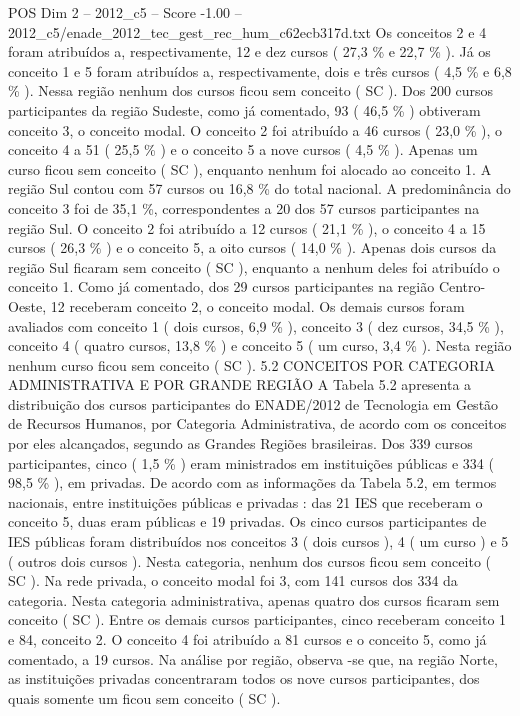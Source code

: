 \begin{textsample}{POS Dim 2 – 2012\_c5 – Score -1.00 – 2012\_c5/enade\_2012\_tec\_gest\_rec\_hum\_c62ecb317d.txt}
Os conceitos 2 e 4 foram atribuídos a, respectivamente, 12 e dez cursos ( 27,3 \% e 22,7 \% ).
Já os conceito 1 e 5 foram atribuídos a, respectivamente, dois e três cursos ( 4,5 \% e 6,8 \% ).
Nessa região nenhum dos cursos ficou sem conceito ( SC ).
Dos 200 cursos participantes da região Sudeste, como já comentado, 93 ( 46,5 \% ) obtiveram conceito 3, o conceito modal.
O conceito 2 foi atribuído a 46 cursos ( 23,0 \% ), o conceito 4 a 51 ( 25,5 \% ) e o conceito 5 a nove cursos ( 4,5 \% ).
Apenas um curso ficou sem conceito ( SC ), enquanto nenhum foi alocado ao conceito 1.
A região Sul contou com 57 cursos ou 16,8 \% do total nacional.
A predominância do conceito 3 foi de 35,1 \%, correspondentes a 20 dos 57 cursos participantes na região Sul.
O conceito 2 foi atribuído a 12 cursos ( 21,1 \% ), o conceito 4 a 15 cursos ( 26,3 \% ) e o conceito 5, a oito cursos ( 14,0 \% ).
Apenas dois cursos da região Sul ficaram sem conceito ( SC ), enquanto a nenhum deles foi atribuído o conceito 1.
Como já comentado, dos 29 cursos participantes na região Centro-Oeste, 12 receberam conceito 2, o conceito modal.
Os demais cursos foram avaliados com conceito 1 ( dois cursos, 6,9 \% ), conceito 3 ( dez cursos, 34,5 \% ), conceito 4 ( quatro cursos, 13,8 \% ) e conceito 5 ( um curso, 3,4 \% ).
Nesta região nenhum curso ficou sem conceito ( SC ). 5.2 CONCEITOS POR CATEGORIA ADMINISTRATIVA E POR GRANDE REGIÃO A Tabela 5.2 apresenta a distribuição dos cursos participantes do ENADE/2012 de Tecnologia em Gestão de Recursos Humanos, por Categoria Administrativa, de acordo com os conceitos por eles alcançados, segundo as Grandes Regiões brasileiras.
Dos 339 cursos participantes, cinco ( 1,5 \% ) eram ministrados em instituições públicas e 334 ( 98,5 \% ), em privadas.
De acordo com as informações da Tabela 5.2, em termos nacionais, entre instituições públicas e privadas : das 21 IES que receberam o conceito 5, duas eram públicas e 19 privadas.
Os cinco cursos participantes de IES públicas foram distribuídos nos conceitos 3 ( dois cursos ), 4 ( um curso ) e 5 ( outros dois cursos ).
Nesta categoria, nenhum dos cursos ficou sem conceito ( SC ).
Na rede privada, o conceito modal foi 3, com 141 cursos dos 334 da categoria.
Nesta categoria administrativa, apenas quatro dos cursos ficaram sem conceito ( SC ).
Entre os demais cursos participantes, cinco receberam conceito 1 e 84, conceito 2.
O conceito 4 foi atribuído a 81 cursos e o conceito 5, como já comentado, a 19 cursos.
Na análise por região, observa -se que, na região Norte, as instituições privadas concentraram todos os nove cursos participantes, dos quais somente um ficou sem conceito ( SC ).

\end{textsample}
